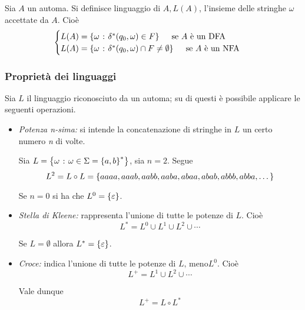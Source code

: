 \documentclass{subfiles}
\begin{document}
\begin{Definition*}
    Sia \(A\) un automa. Si definisce linguaggio di \(A, L(A)\), l'insieme delle stringhe \(\omega\) accettate da \(A\). Cioè
    \[\begin{cases}
            L(A) = \set{\omega}{\delta^{*}(q_{0}, \omega) \in F} \quad \text{se} A \text{è un DFA} \\
            L(A) = \set{\omega}{\delta^{*}(q_{0}, \omega) \cap F \neq \emptyset} \quad \text{se} A \text{è un NFA}
        \end{cases}\]
\end{Definition*}

\subsubsection{Proprietà dei linguaggi}
Sia \(L\) il linguaggio riconosciuto da un automa; su di questi è possibile applicare le seguenti operazioni.
\begin{itemize}
    \item \emph{Potenza n-sima:} si intende la concatenazione di stringhe in \(L\) un certo numero \emph{n} di volte.
          \begin{Example*}
              Sia \(L = \left\{\omega \operatorname{\: {:} \:} \omega \in \Sigma = \left\{a, b\right\}^{*}\right\}\), sia \(n = 2\). Segue
              \[
                  L^{2} = L \circ L = \left\{aaaa, aaab, aabb, aaba, abaa, abab, abbb, abba, \dots\right\}
              \]
          \end{Example*}
          \begin{Remark*}
              Se \(n = 0\) si ha che \(L^{0} = \left\{\varepsilon\right\}\).
          \end{Remark*}

    \item \emph{Stella di Kleene:} rappresenta l'unione di tutte le potenze di \(L\). Cioè
          \[
              L^{*} = L^{0} \cup L^{1} \cup L^{2} \cup \cdots
          \]
          \begin{Remark*}
              Se \(L = \emptyset\) allora \(L^{*} = \left\{\varepsilon\right\}\).
          \end{Remark*}

    \item \emph{Croce:} indica l'unione di tutte le potenze di \(L \text{, meno} L^{0}\). Cioè
          \[
              L^{+} = L^{1} \cup L^{2} \cup \cdots
          \]

          \noindent Vale dunque
          \[
              L^{+} = L \circ L^{*}
          \]
\end{itemize}
\end{document}
